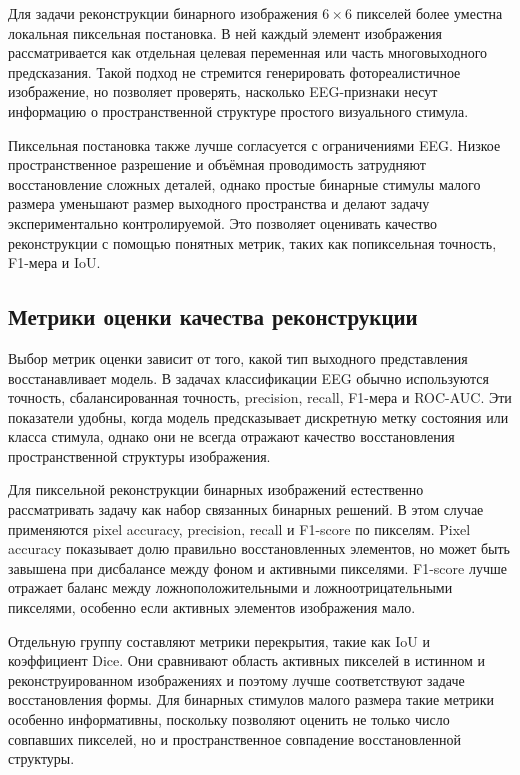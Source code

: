 Для задачи реконструкции бинарного изображения $6 \times 6$ пикселей более уместна локальная пиксельная постановка. В ней каждый элемент изображения рассматривается как отдельная целевая переменная или часть многовыходного предсказания. Такой подход не стремится генерировать фотореалистичное изображение, но позволяет проверять, насколько EEG-признаки несут информацию о пространственной структуре простого визуального стимула.

Пиксельная постановка также лучше согласуется с ограничениями EEG. Низкое пространственное разрешение и объёмная проводимость затрудняют восстановление сложных деталей, однако простые бинарные стимулы малого размера уменьшают размер выходного пространства и делают задачу экспериментально контролируемой. Это позволяет оценивать качество реконструкции с помощью понятных метрик, таких как попиксельная точность, F1-мера и IoU.

\subsection{Метрики оценки качества реконструкции}

Выбор метрик оценки зависит от того, какой тип выходного представления восстанавливает модель. В задачах классификации EEG обычно используются точность, сбалансированная точность, precision, recall, F1-мера и ROC-AUC. Эти показатели удобны, когда модель предсказывает дискретную метку состояния или класса стимула, однако они не всегда отражают качество восстановления пространственной структуры изображения.

Для пиксельной реконструкции бинарных изображений естественно рассматривать задачу как набор связанных бинарных решений. В этом случае применяются pixel accuracy, precision, recall и F1-score по пикселям. Pixel accuracy показывает долю правильно восстановленных элементов, но может быть завышена при дисбалансе между фоном и активными пикселями. F1-score лучше отражает баланс между ложноположительными и ложноотрицательными пикселями, особенно если активных элементов изображения мало.

Отдельную группу составляют метрики перекрытия, такие как IoU и коэффициент Dice. Они сравнивают область активных пикселей в истинном и реконструированном изображениях и поэтому лучше соответствуют задаче восстановления формы. Для бинарных стимулов малого размера такие метрики особенно информативны, поскольку позволяют оценить не только число совпавших пикселей, но и пространственное совпадение восстановленной структуры.

